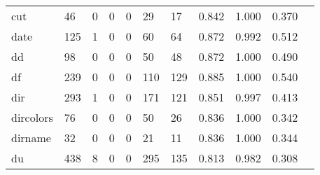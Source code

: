\begin{longtable}{lp{1.10cm}p{1.10cm}p{1.10cm}p{1.10cm}p{1.10cm}p{1.10cm}p{1.10cm}p{1.10cm}p{1.10cm}p{1.10cm}}
cut       &                     46 &                                  0 &                                 0 &                                0 &                                29 &                              17 &                          0.842 &                                 1.000 &                               0.370 \\
date      &                    125 &                                  1 &                                 0 &                                0 &                                60 &                              64 &                          0.872 &                                 0.992 &                               0.512 \\
dd        &                     98 &                                  0 &                                 0 &                                0 &                                50 &                              48 &                          0.872 &                                 1.000 &                               0.490 \\
df        &                    239 &                                  0 &                                 0 &                                0 &                               110 &                             129 &                          0.885 &                                 1.000 &                               0.540 \\
dir       &                    293 &                                  1 &                                 0 &                                0 &                               171 &                             121 &                          0.851 &                                 0.997 &                               0.413 \\
dircolors &                     76 &                                  0 &                                 0 &                                0 &                                50 &                              26 &                          0.836 &                                 1.000 &                               0.342 \\
dirname   &                     32 &                                  0 &                                 0 &                                0 &                                21 &                              11 &                          0.836 &                                 1.000 &                               0.344 \\
du        &                    438 &                                  8 &                                 0 &                                0 &                               295 &                             135 &                          0.813 &                                 0.982 &                               0.308 \\

\end{longtable}
